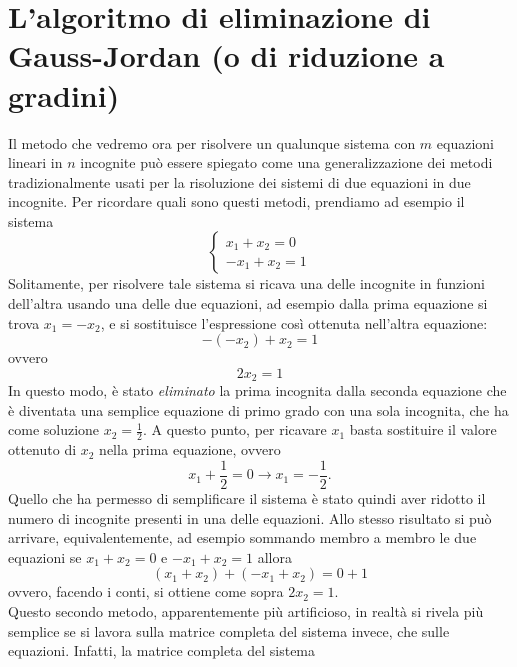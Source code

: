 \documentclass{book}
\theoremstyle{definition}
\theoremstyle{plain}
\begin{document}
\section{L'algoritmo di eliminazione di Gauss-Jordan (o di riduzione a gradini)}
\label{sec:gauss-jordan}
Il metodo che vedremo ora per risolvere un qualunque sistema con $m$
equazioni lineari in $n$ incognite può essere spiegato come una
generalizzazione dei metodi tradizionalmente usati per la risoluzione dei
sistemi di due equazioni in due incognite. Per ricordare quali sono
questi metodi, prendiamo ad esempio il sistema
\begin{equation}
  \label{eq:gauss-jorda1}
  \begin{cases}
    x_1+x_2=0\\
    -x_1+x_2=1
  \end{cases}
\end{equation}
Solitamente, per risolvere tale sistema si ricava una delle incognite in
funzioni dell'altra usando una delle due equazioni, ad esempio dalla prima
equazione si trova $x_1=-x_2$, e si sostituisce l'espressione così
ottenuta nell'altra equazione:
\begin{equation*}
  -(-x_2)+x_2=1
\end{equation*}
ovvero
\begin{equation*}
  2x_2=1
\end{equation*}
In questo modo, è stato \emph{eliminato} la prima incognita dalla seconda
equazione che è diventata una semplice equazione di primo grado con una
sola incognita, che ha come soluzione $x_2=\frac{1}{2}$. A questo punto,
per ricavare $x_1$ basta sostituire il valore ottenuto di $x_2$ nella
prima equazione, ovvero
\begin{equation*}
  x_1+\frac{1}{2}=0 \to x_1=-\frac{1}{2}.
\end{equation*}
Quello che ha permesso di semplificare il sistema è stato quindi aver
ridotto il numero di incognite presenti in una delle equazioni. Allo
stesso risultato si può arrivare, equivalentemente, ad esempio sommando
membro a membro le due equazioni se $x_1+x_2=0$ e $-x_1+x_2=1$ allora
\begin{equation*}
  (x_1+x_2)+(-x_1+x_2)=0+1
\end{equation*}
ovvero, facendo i conti, si ottiene come sopra $2x_2=1$.\\
Questo secondo metodo, apparentemente più artificioso, in realtà si rivela
più semplice se si lavora sulla matrice completa del sistema invece, che
sulle equazioni. Infatti, la matrice completa del sistema
\end{document}
